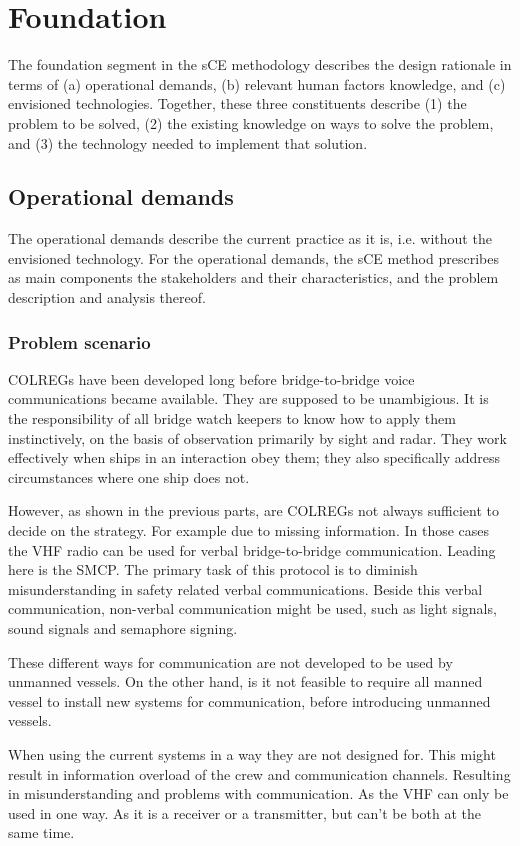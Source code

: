 \chapter{Foundation}
The foundation segment in the \ac{sCE} methodology describes the design rationale in terms of (a) operational demands, (b) relevant human factors knowledge, and (c) envisioned technologies. Together, these three constituents describe (1) the problem to be solved, (2) the existing knowledge on ways to solve the problem, and (3) the technology needed to implement that solution.

\section{Operational demands}
The operational demands describe the current practice as it is, i.e. without the envisioned technology. For the operational demands, the sCE method prescribes as main components the stakeholders and their characteristics, and the problem description and analysis thereof.

\subsection{Problem scenario}
\acf{COLREGs} have been developed long before bridge-to-bridge voice communications became available. They are supposed to be unambigious. It is the responsibility of all bridge watch keepers to know how to apply them instinctively, on the basis of observation primarily by sight and radar. They work effectively when ships in an interaction obey them; they also specifically address circumstances where one ship does not.

However, as shown in the previous parts, are \ac{COLREGs} not always sufficient to decide on the strategy. For example due to missing information. In those cases the \ac{VHF} radio can be used for verbal bridge-to-bridge communication. Leading here is the \acf{SMCP}. The primary task of this protocol is to diminish misunderstanding in safety related verbal communications. 
Beside this verbal communication, non-verbal communication might be used, such as light signals, sound signals and semaphore signing.

These different ways for communication are not developed to be used by unmanned vessels. On the other hand, is it not feasible to require all manned vessel to install new systems for communication, before introducing unmanned vessels.

When using the current systems in a way they are not designed for. This might result in information overload of the crew and communication channels. Resulting in misunderstanding and problems with communication. As the \ac{VHF} can only be used in one way. As it is a receiver or a transmitter, but can't be both at the same time. 

